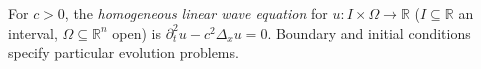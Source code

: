 
For $c>0$, the \emph{homogeneous linear wave equation} for $u:I\times\Omega\to\mathbb R$ ($I\subseteq\mathbb R$ an interval, $\Omega\subseteq\mathbb R^n$ open) is $\partial_t^2u-c^2\Delta_xu=0$. Boundary and initial conditions specify particular evolution problems.
